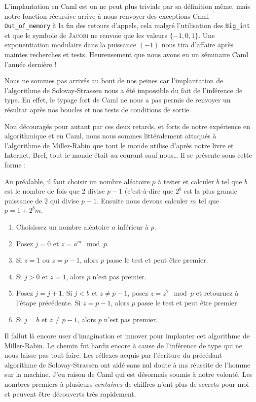 \documentclass[a4paper,12pt]{article}
\begin{document}
L'implantation en Caml est on ne peut plus triviale par sa définition même, mais notre fonction récursive arrive à nous renvoyer des exceptions Caml \texttt{Out\_of\_memory} à la fin des retours d'appels, cela malgré l'utilisation des \texttt{Big\_int} et que le symbole de \textsc{Jacobi} ne renvoie que les valeurs $\{- 1, 0, 1\}$. Une exponentiation modulaire dans la puissance $(- 1)$ nous tira d'affaire après maintes recherches et tests. Heureusement que nous avons eu un séminaire Caml l'année dernière !

Nous ne sommes pas arrivés au bout de nos peines car l'implantation de l'algorithme de Solovay-Strassen nous a été impossible du fait de l'inférence de type. En effet, le typage fort de Caml ne nous a pas permis de renvoyer un résultat après nos boucles et nos tests de conditions de sortie.

\bigskip

Non découragés pour autant par ces deux retards, et forts de notre expé\-rience en algorithmique et en Caml, nous nous sommes littéralement attaqués à l'algorithme de Miller-Rabin que \og tout le monde utilise \fg{} d'après notre livre et Internet. Bref, tout le monde était au courant sauf nous\dots{} Il se présente sous cette forme :

Au préalable, il faut choisir un nombre aléatoire $p$ à tester et calculer $b$ tel que $b$ est le nombre de fois que 2 divise $p - 1$ (c'est-à-dire que $2^b$ est la plus grande puissance de 2 qui divise $p - 1$. Ensuite nous devons calculer $m$ tel que $p = 1 + 2^{b}m$.

\begin{enumerate}
\item Choisissez un nombre aléatoire $a$ inférieur à $p$.
\item Posez $j = 0$ et $z = a^{m} \mod p$.
\item Si $z = 1$ ou $z = p - 1$, alors $p$ passe le test et peut être premier.
\item Si $j > 0$ et $z = 1$, alors $p$ n'est pas premier.
\item Posez $j = j + 1$. Si $j < b$ et $z \ne p - 1$, posez $z = z^{2} \mod p$ et retournez à l'étape précédente. Si $z = p - 1$, alors $p$ passe le test et peut être premier.
\item Si $j = b$ et $z \ne p - 1$, alors $p$ n'est pas premier.
\end{enumerate}

Il fallut là encore user d'imagination et innover pour implanter cet algorithme de Miller-Rabin. Le chemin fut hardu encore à cause de l'inférence de type qui ne nous laisse pas tout faire. Les réflexes acquis par l'écriture du précédant algorithme de Solovay-Strassen ont aidé sans nul doute à ma réussite de l'homme sur la machine. J'eu raison de Caml qui est désormais soumis à notre volonté. Les nombres premiers à plusieurs \emph{centaines} de chiffres n'ont plus de secrets pour moi et peuvent être découverts très rapidement.
\end{document}
